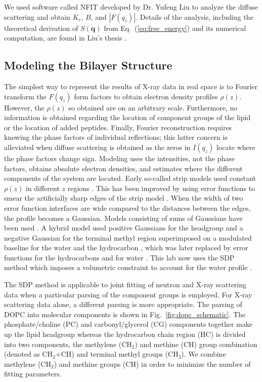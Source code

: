 We used software called NFIT developed by Dr. Yufeng Liu
\cite{Lyatskaya01,Liu04,Liu03} to analyze the diffuse scattering and
obtain $K_c$, $B$, and $|F(q_z)|$. 
Details of the analysis, including the theoretical derivation of
$S(\mathbf{q})$ from Eq.~(\ref{eq:free_energy}) and its
numerical computation, are found in Liu's thesis 
\cite{Liu03}. 

\subsection{Modeling the Bilayer Structure}\label{sec:SDP_method}
The simplest way to represent the results of X-ray data in real space is to 
Fourier transform the $F(q_z)$ form factors to obtain electron density profiles 
$\rho(z)$. However, the $\rho(z)$ so obtained are on an arbitrary scale.  
Furthermore, no information is obtained regarding the location of component 
groups of the lipid or the location of added peptides.  
Finally, Fourier reconstruction requires knowing the phase factors of individual 
reflections; this latter concern is alleviated when diffuse scattering is 
obtained as the zeros in $I(q_z)$ locate where the phase factors change sign.  
Modeling uses the intensities, not the phase factors, obtains absolute electron densities, and 
estimates where the different components of the system are located.  
Early so-called strip models used constant $\rho(z)$ in different $z$ regions
\cite{King86}.  
This has been improved by using error functions to smear the artificially sharp 
edges of the strip model \cite{Heinrich14,Shekhar11}. 
When the width of two error function interfaces are wide compared to the distances 
between the edges, the profile becomes a Gaussian.  
Models consisting of sums of Gaussians have been used \cite{Mitsui78}.  
A hybrid model used positive Gaussians for the headgroup and a negative Gaussian 
for the terminal methyl region superimposed on a modulated baseline for the water 
and the hydrocarbon \cite{ref:Wiener89}, which was later replaced by 
error functions for the hydrocarbons and for water \cite{Klauda06}.  
This lab now uses the SDP method which imposes a volumetric constraint to account 
for the water profile \cite{Kucerka08}.  

The SDP method is applicable to joint fitting of neutron and X-ray scattering data 
when a particular parsing of the component groups is employed.  
For X-ray scattering data alone, a different parsing is more appropriate.  
The parsing of DOPC into molecular components is shown in
Fig.~\ref{fig:dopc_schematic}. The phosphate/choline (PC) and 
carbonyl/glycerol (CG) components together make up the lipid headgroup
whereas the hydrocarbon chain region (HC)
is divided into two components, the methylene (CH$_2$) and methine (CH) group
combination (denoted as CH$_2$+CH) and terminal methyl groups (CH$_3$). 
We combine methylene (CH$_2$) and methine groups (CH) in order to 
minimize the number of fitting parameters.


